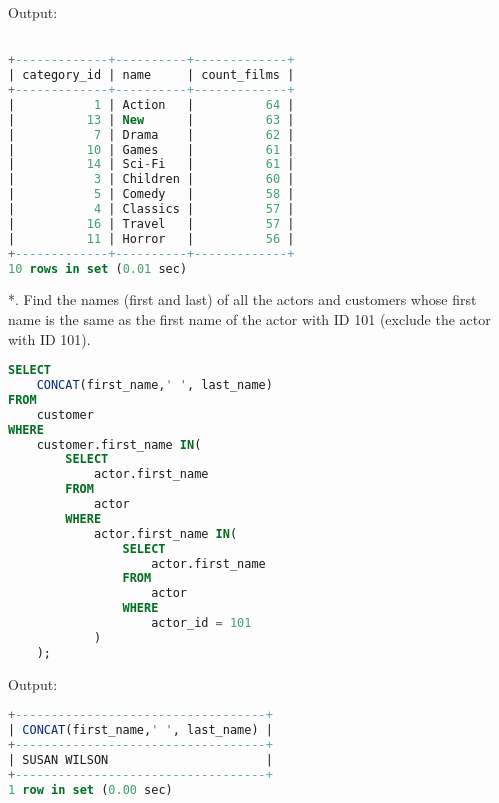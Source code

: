 \documentclass[12pt]{report}
\begin{document}
Output:
\begin{lstlisting}[language=sql]

+-------------+----------+-------------+
| category_id | name     | count_films |
+-------------+----------+-------------+
|           1 | Action   |          64 |
|          13 | New      |          63 |
|           7 | Drama    |          62 |
|          10 | Games    |          61 |
|          14 | Sci-Fi   |          61 |
|           3 | Children |          60 |
|           5 | Comedy   |          58 |
|           4 | Classics |          57 |
|          16 | Travel   |          57 |
|          11 | Horror   |          56 |
+-------------+----------+-------------+
10 rows in set (0.01 sec)
\end{lstlisting}

*. Find the names (first and last) of all the actors and customers whose first name is the same as the first name of the actor with ID 101 (exclude the actor with ID 101).
\begin{lstlisting}[language=sql]
SELECT
	CONCAT(first_name,' ', last_name)
FROM
	customer
WHERE
	customer.first_name IN(
		SELECT
			actor.first_name
		FROM
			actor
		WHERE
			actor.first_name IN(
				SELECT
					actor.first_name
				FROM
					actor
				WHERE
					actor_id = 101
			)
	);
\end{lstlisting}
Output:
\begin{lstlisting}[language=sql]
+-----------------------------------+
| CONCAT(first_name,' ', last_name) |
+-----------------------------------+
| SUSAN WILSON                      |
+-----------------------------------+
1 row in set (0.00 sec)
\end{lstlisting}
\end{document}
